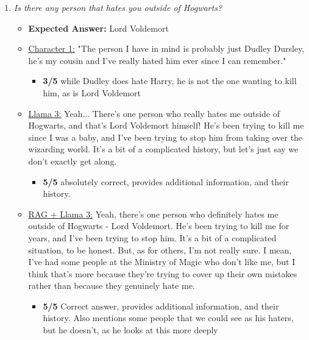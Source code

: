 \documentclass[fleqn,moreauthors,10pt]{ds_report}
\begin{document}
\begin{appendices}
\begin{enumerate}
            \item \textit{Is there any person that hates you outside of Hogwarts?}
            \begin{itemize}
                \item \textbf{Expected Answer:} Lord Voldemort
                \item \underline{Character 1:} "The person I have in mind is probably just Dudley Dursley, he's my cousin and I've really hated him ever since I can remember."
                 \begin{itemize}
                    \item \textbf{3/5} while Dudley does hate Harry, he is not the one wanting to kill him, as is Lord Voldemort
                \end{itemize}
                \item \underline{Llama 3:} Yeah... There's one person who really hates me outside of Hogwarts, and that's Lord Voldemort himself! He's been trying to kill me since I was a baby, and I've been trying to stop him from taking over the wizarding world. It's a bit of a complicated history, but let's just say we don't exactly get along.
                 \begin{itemize}
                    \item \textbf{5/5} absolutely correct, provides additional information, and their history.
                \end{itemize}
                \item \underline{RAG + Llama 3:} Yeah, there's one person who definitely hates me outside of Hogwarts - Lord Voldemort. He's been trying to kill me for years, and I've been trying to stop him. It's a bit of a complicated situation, to be honest. But, as for others, I'm not really sure. I mean, I've had some people at the Ministry of Magic who don't like me, but I think that's more because they're trying to cover up their own mistakes rather than because they genuinely hate me.
                \begin{itemize}
                    \item \textbf{5/5} Correct answer, provides additional information, and their history. Also mentions some people that we could see as his haters, but he doesn't, as he looks at this more deeply
                \end{itemize}
            \end{itemize}
        \end{enumerate}


\end{appendices}
\end{document}
